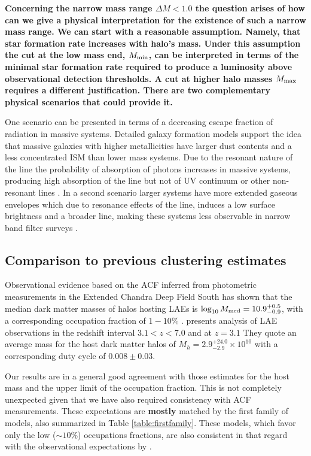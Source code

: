 \documentclass[usenatbib]{mn2e}
\newcommand{\ly}{{\ifmmode{{\rm Ly}\alpha}\else{Ly$\alpha$~}\fi}}
\newcommand{\hMsun}{{\ifmmode{h^{-1}{\rm
        {M_{\odot}}}}\else{$h^{-1}{\rm{M_{\odot}}}$}\fi}}
\newcommand{\Msun}{{\ifmmode{{\rm {M_{\odot}}}}\else{${\rm{M_{\odot}}}$}\fi}}
\begin{document}
{\bf Concerning the narrow mass range $\Delta M
  <1.0$ the question arises of how can we give a physical
  interpretation for the existence of such  a narrow mass range. We
  can start with a reasonable   assumption. Namely, that star formation
  rate increases with halo's  mass. Under this assumption the cut at
  the low mass end, $M_{\rm min}$, can be interpreted in terms of the
  minimal star formation rate required to produce a \ly luminosity
  above observational detection thresholds.   A cut at higher halo
  masses $M_{\rm  max}$ requires a different justification. There are
  two complementary physical scenarios that could provide it.}

One scenario can be presented in terms of a decreasing escape fraction
of \ly radiation in massive systems. Detailed galaxy formation models
support the idea that massive galaxies with higher metallicities have
larger dust contents and a less concentrated ISM than lower mass
systems. Due to the resonant nature of the \ly line the probability of
absorption  of \ly photons increases in massive systems, producing
high absorption of the \ly line but not of UV continuum or other
non-resonant lines \citep{Laursen2009,ForeroRomero2011}. In a second
scenario larger systems have more extended gaseous envelopes which due
to resonance effects of the \ly line, induces a low surface brightness
and a broader line, making these systems less observable in narrow
band filter surveys \citep{Laursen2009,Zheng2010}.    


\subsection{Comparison to previous clustering estimates}

Observational evidence based on the ACF inferred from photometric
measurements in the Extended Chandra Deep Field South has shown that
the median dark matter masses of halos hosting LAEs is
$\log_{10}M_{\rm  med}=10.9^{+0.5}_{-0.9}$\Msun, with a corresponding
occupation fraction of $1-10\%$  \citep{Gawiser07}.  \cite{Ouchi2010}
presents analysis of LAE observations in the redshift interval
$3.1<z<7.0$ and at $z=3.1$ They quote an average mass for the host
dark matter halos of $M_{h}=2.9^{+24.0}_{-2.9}\times 10^{10}$ \hMsun
with a corresponding duty cycle of $0.008\pm 0.03$.  

Our results are in a general good agreement with those estimates for
the host mass and the upper limit of the occupation fraction. This is
not completely unexpected given that we have also required consistency
with ACF measurements. These expectations are {\bf mostly} matched by
the first family of models, also summarized in Table
\ref{table:firstfamily}. These models, which favor only the  low
($\sim 10\%$) occupations fractions, are also consistent in that
regard with the observational expectations by \cite{Gawiser07}. 
\end{document}
